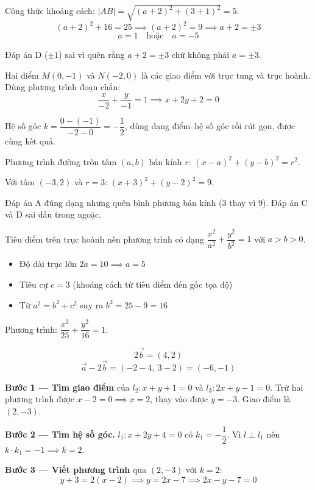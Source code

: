 \documentclass[11pt, a4paper]{article}
\begin{document}
\begin{dapan}[14 — Đáp án A]
Công thức khoảng cách: $|AB|=\sqrt{(a+2)^2+(3+1)^2}=5$.
\[
(a+2)^2+16=25 \implies (a+2)^2=9 \implies a+2=\pm 3
\]
\[
a=1 \quad \text{hoặc} \quad a=-5
\]

 Đáp án D ($\pm 1$) sai vì quên rằng $a+2=\pm3$ chứ không phải $a=\pm3$.
\end{dapan}

\begin{dapan}[15 — Đáp án B]
Hai điểm $M(0,-1)$ và $N(-2,0)$ là các giao điểm với trục tung và trục hoành. Dùng phương trình đoạn chắn:
\[
\frac{x}{-2}+\frac{y}{-1}=1 \implies x+2y+2=0
\]

 Hệ số góc $k=\dfrac{0-(-1)}{-2-0}=-\dfrac{1}{2}$, dùng dạng điểm–hệ số góc rồi rút gọn, được cùng kết quả.
\end{dapan}

\begin{dapan}[16 — Đáp án B]
Phương trình đường tròn tâm $(a,b)$ bán kính $r$: $(x-a)^2+(y-b)^2=r^2$.

Với tâm $(-3,2)$ và $r=3$: $(x+3)^2+(y-2)^2=9$.

 Đáp án A đúng dạng nhưng quên bình phương bán kính ($3$ thay vì $9$). Đáp án C và D sai dấu trong ngoặc.
\end{dapan}

\begin{dapan}[17 — Đáp án B]
Tiêu điểm trên trục hoành nên phương trình có dạng $\dfrac{x^2}{a^2}+\dfrac{y^2}{b^2}=1$ với $a>b>0$.

\begin{itemize}[leftmargin=1.4em, itemsep=2pt]
\item Độ dài trục lớn $2a=10 \implies a=5$
\item Tiêu cự $c=3$ (khoảng cách từ tiêu điểm đến gốc tọa độ)
\item Từ $a^2=b^2+c^2$ suy ra $b^2=25-9=16$
\end{itemize}

Phương trình: $\dfrac{x^2}{25}+\dfrac{y^2}{16}=1$.
\end{dapan}

\begin{dapan}[18 — Đáp án A]
\[
2\vec{b}=(4,2)
\]
\[
\vec{a}-2\vec{b}=(-2-4,\ 3-2)=(-6,-1)
\]
\end{dapan}

\begin{dapan}[19 — Đáp án A]
\textbf{Bước 1 — Tìm giao điểm} của $l_2: x+y+1=0$ và $l_3: 2x+y-1=0$. Trừ hai phương trình được $x-2=0 \implies x=2$, thay vào được $y=-3$. Giao điểm là $(2,-3)$.

\textbf{Bước 2 — Tìm hệ số góc.} $l_1: x+2y+4=0$ có $k_1=-\dfrac{1}{2}$. Vì $l \perp l_1$ nên $k \cdot k_1=-1 \implies k=2$.

\textbf{Bước 3 — Viết phương trình} qua $(2,-3)$ với $k=2$:
\[
y+3=2(x-2) \implies y=2x-7 \implies 2x-y-7=0
\]
\end{dapan}
\end{document}
